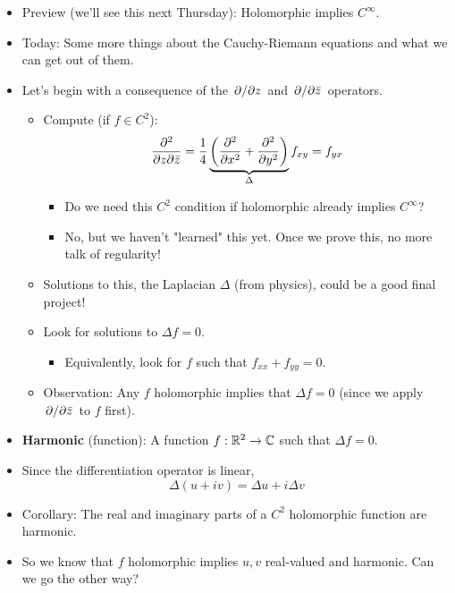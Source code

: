 \documentclass[../notes.tex]{subfiles}
\begin{document}
\begin{itemize}
    \item Preview (we'll see this next Thursday): Holomorphic implies $C^\infty$.
    \item Today: Some more things about the Cauchy-Riemann equations and what we can get out of them.
    \item Let's begin with a consequence of the $\pdv*{z}$ and $\pdv*{\bar{z}}$ operators.
    \begin{itemize}
        \item Compute (if $f\in C^2$):
        \begin{equation*}
            \pdv{}{z}{\bar{z}} = \frac{1}{4}\underbrace{\left( \pdv[2]{x}+\pdv[2]{y} \right)}_{\Delta}f_{xy}=f_{yx}
        \end{equation*}
        \begin{itemize}
            \item Do we need this $C^2$ condition if holomorphic already implies $C^\infty$?
            \item No, but we haven't "learned" this yet. Once we prove this, no more talk of regularity!
        \end{itemize}
        \item Solutions to this, the Laplacian $\Delta$ (from physics), could be a good final project!
        \item Look for solutions to $\Delta f=0$.
        \begin{itemize}
            \item Equivalently, look for $f$ such that $f_{xx}+f_{yy}=0$.
        \end{itemize}
        \item Observation: Any $f$ holomorphic implies that $\Delta f=0$ (since we apply $\pdv*{\bar{z}}$ to $f$ first).
    \end{itemize}
    \item \textbf{Harmonic} (function): A function $f:\mathbb{R}^2\to\mathbb{C}$ such that $\Delta f=0$.
    \item Since the differentiation operator is linear,
    \begin{equation*}
        \Delta(u+iv) = \Delta u+i\Delta v
    \end{equation*}
    \item Corollary: The real and imaginary parts of a $C^2$ holomorphic function are harmonic.
    \item So we know that $f$ holomorphic implies $u,v$ real-valued and harmonic. Can we go the other way?
    \begin{itemize}

\end{itemize}
\end{itemize}
\end{document}
